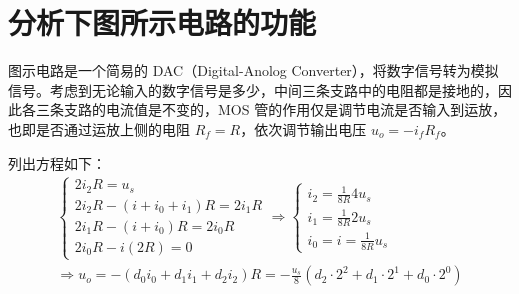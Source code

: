 \documentclass[UTF8]{report}
\theoremstyle{MyLineTheoremStyle} %
\theoremstyle{MyBlockTheoremStyle} %
\theoremstyle{MySubsubsectionStyle} %
\begin{document}
\section{分析下图所示电路的功能}
图示电路是一个简易的 DAC（Digital-Anolog Converter），将数字信号转为模拟信号。考虑到无论输入的数字信号是多少，中间三条支路中的电阻都是接地的，因此各三条支路的电流值是不变的，MOS 管的作用仅是调节电流是否输入到运放，也即是否通过运放上侧的电阻 $R_f = R$，依次调节输出电压 $u_o = -i_fR_f$。

列出方程如下：
\begin{gather}
\begin{cases}
    2i_2R = u_s \\ 
    2i_2R - (i + i_0 + i_1)R = 2i_1R \\ 
    2i_1R - (i + i_0 )R = 2i_0R \\ 
    2i_0R - i(2R) = 0
\end{cases}
\Longrightarrow 
\begin{cases}
    i_2 = \frac{1}{8R} 4u_s \\ 
    i_1 = \frac{1}{8R} 2u_s \\ 
    i_0 = i = \frac{1}{8R} u_s
\end{cases} \\ 
\Longrightarrow 
u_o = - (d_0i_0 + d_1i_1 + d_2i_2)R = -\frac{u_s}{8}\left( d_2\cdot 2^2 + d_1\cdot 2^1 + d_0\cdot 2^0 \right)
\end{gather}





\newpage
\appendix
\titleformat{\chapter}[hang]{\normalfont\huge\bfseries\centering}{}{20pt}{}
\titlespacing*{\chapter}{0pt}{-25pt}{8pt} %
\titleformat{\section}[hang]{\normalfont\centering\Large\bfseries  }{\thesection}{8pt}{}


\end{document}
